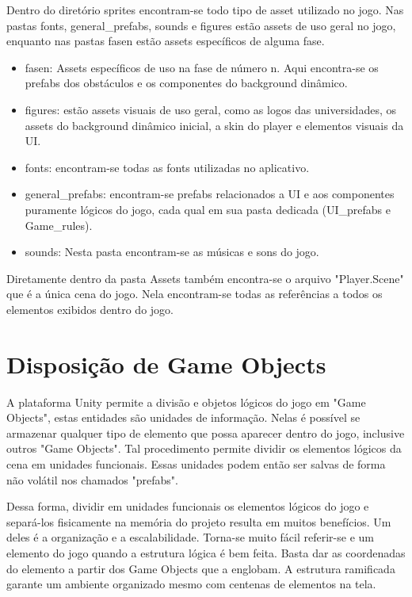     Dentro do diretório sprites encontram-se todo tipo de asset utilizado no jogo. 
    Nas pastas fonts, general\_prefabs, sounds e figures estão assets de uso geral no jogo, enquanto nas pastas fasen estão assets específicos de alguma fase.

    \begin{itemize}
        \item fasen: Assets específicos de uso na fase de número n. Aqui encontra-se os prefabs dos obstáculos e os componentes do background dinâmico.
        \item figures: estão assets visuais de uso geral, como as logos das universidades, os assets do background dinâmico inicial, a skin do player e elementos visuais da UI.
        \item fonts: encontram-se todas as fonts utilizadas no aplicativo.
        \item general\_prefabs: encontram-se prefabs relacionados a UI e aos componentes puramente lógicos do jogo, cada qual em sua pasta dedicada (UI\_prefabs e Game\_rules).
        \item sounds: Nesta pasta encontram-se as músicas e sons do jogo.
    \end{itemize}

    Diretamente dentro da pasta Assets também encontra-se o arquivo "Player.Scene" que é a única cena do jogo. Nela encontram-se todas as referências a todos os elementos exibidos dentro do jogo.

    \section{Disposição de Game Objects}

    A plataforma Unity permite a divisão e objetos lógicos do jogo em "Game Objects", estas entidades são unidades de informação.
    Nelas é possível se armazenar qualquer tipo de elemento que possa aparecer dentro do jogo, inclusive outros "Game Objects". 
    Tal procedimento permite dividir os elementos lógicos da cena em unidades funcionais.
    Essas unidades podem então ser salvas de forma não volátil nos chamados "prefabs". 

    Dessa forma, dividir em unidades funcionais os elementos lógicos do jogo e separá-los fisicamente na memória do projeto resulta em muitos benefícios. 
    Um deles é a organização e a escalabilidade.
    Torna-se muito fácil referir-se e um elemento do jogo quando a estrutura lógica é bem feita. 
    Basta dar as coordenadas do elemento a partir dos Game Objects que a englobam.
    A estrutura ramificada garante um ambiente organizado mesmo com centenas de elementos na tela.

